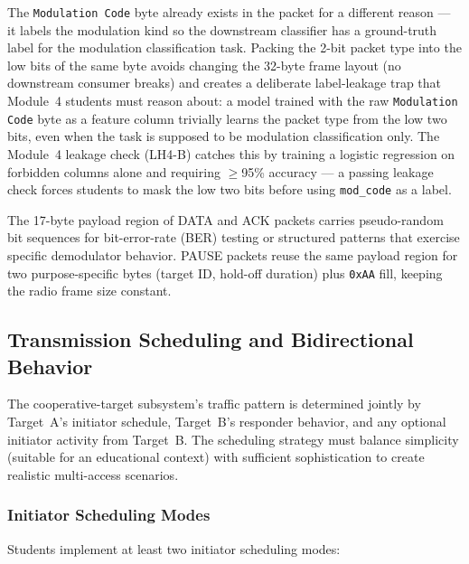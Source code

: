 \documentclass[11pt,letterpaper]{article}
\begin{document}
	\begin{tcolorbox}[infobox={Design Rationale: Why Pack the Type into the Modulation Code Byte?}]
		The \texttt{Modulation Code} byte already exists in the packet for a different reason --- it labels the modulation kind so the downstream classifier has a ground-truth label for the modulation classification task. Packing the 2-bit packet type into the low bits of the same byte avoids changing the 32-byte frame layout (no downstream consumer breaks) and creates a deliberate label-leakage trap that Module~4 students must reason about: a model trained with the raw \texttt{Modulation Code} byte as a feature column trivially learns the packet type from the low two bits, even when the task is supposed to be modulation classification only. The Module~4 leakage check (LH4-B) catches this by training a logistic regression on forbidden columns alone and requiring $\geq$95\% accuracy --- a passing leakage check forces students to mask the low two bits before using \texttt{mod\_code} as a label.

		The 17-byte payload region of DATA and ACK packets carries pseudo-random bit sequences for bit-error-rate (BER) testing or structured patterns that exercise specific demodulator behavior. PAUSE packets reuse the same payload region for two purpose-specific bytes (target ID, hold-off duration) plus \texttt{0xAA} fill, keeping the radio frame size constant.
	\end{tcolorbox}

	\newpage
	\subsection{Transmission Scheduling and Bidirectional Behavior}

	The cooperative-target subsystem's traffic pattern is determined jointly by Target~A's initiator schedule, Target~B's responder behavior, and any optional initiator activity from Target~B. The scheduling strategy must balance simplicity (suitable for an educational context) with sufficient sophistication to create realistic multi-access scenarios.

	\subsubsection{Initiator Scheduling Modes}

	Students implement at least two initiator scheduling modes:
\end{document}

